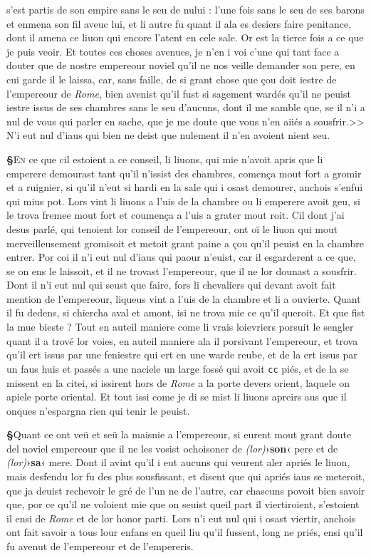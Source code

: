\documentclass[12pt]{article} %
\newcommand{\colmar}[1]{\marginnote{[#1]}}          %
\newcommand{\placeName}[1]{\emph{#1}} %
\newcommand{\num}[1]{\texttt{#1}}    %
\newcommand{\corr}[2]{\emph{(#1)}\textbf{›#2‹}} %
\newcommand{\supplied}[1]{\textlangle#1\textrangle} %
\newcounter{paranum}
\newcommand{\pnum}{\stepcounter{paranum}\textbf{§\arabic{paranum}}\quad}
\begin{document}
s'est partis de son empire sans le seu de nului : l'une fois sans le seu de ses barons et enmena son fil aveuc lui, et li autre fu quant il ala es desiers faire penitance, dont il amena ce liuon qui encore l'atent en cele sale. Or est la tierce fois a ce que je puis veoir. Et toutes ces choses avenues, je n'en i voi c'une qui tant face a douter que de nostre empereour noviel qu'il ne nos veille demander son pere, en cui garde il le laissa, car, sans faille, de si grant chose que çou doit iestre de l'empereour de \placeName{Rome}, bien avenist qu'il fust si sagement wardés qu'il ne peuist iestre issus de ses chambres sans le seu d'aucuns, dont il me samble que, se il n'i a nul de vous qui parler en sache, que je me doute que vous n'en aiiés a sousfrir.>> N'i eut nul d'iaus qui bien ne deist que nulement il n'en avoient nient seu.


\pnum \lettrine[lines=2]{\color{darkblue}E}{n} ce que cil estoient a ce conseil, li liuons, qui mie n'avoit apris que li emperere demourast tant qu'il n'issist des chambres, comença mout fort a gromir et a ruignier, si qu'il n'eut si hardi en la sale qui i osast demourer, anchois s'enfui qui mius pot. Lors vint li liuons a l'uis de la chambre ou li emperere avoit geu, si le trova fremee mout fort et coumença a l'uis a grater mout roit. Cil dont j'ai desus parlé, \supplied{qui} tenoient lor conseil de l'empereour, ont oï le liuon qui mout merveilleusement gromisoit et metoit grant paine a çou qu'il peuist en la chambre entrer. Por coi il n'i eut nul d'iaus qui paour n'euist, car il esgarderent a ce que, se on ens le laissoit, et il ne trovast l'empereour, que il ne lor dounast a sousfrir. Dont il n'i eut nul qui seust que faire, fors li chevaliers qui devant avoit fait mention de l'empereour, liqueus vint a l'uis de la chambre et li a ouvierte. Quant il fu dedens, si chiercha aval et amont, isi ne trova mie ce qu'il queroit. Et que fist la mue bieste ? Tout en auteil maniere come li vrais loievriers porsuit le sengler quant il a trové lor voies, en auteil maniere ala il porsivant l'empereour, et trova qu'il ert issus par une feniestre qui ert en une warde reube, et de la ert issus par un faus huis et passés a une naciele un large fossé qui avoit \num{cc} piés, et de la se missent en la citei, si issirent hors de \placeName{Rome} a la porte devers orient, laquele on apiele porte oriental. Et tout issi come je di se mist li liuons apreirs aus que il onques n'espargna rien qui tenir le peuist.


\pnum Quant ce ont veü et seü la maisnie a l'empereour, si eurent mout grant doute del noviel empereour que il ne les vosist ochoisoner de \corr{lor}{son} pere et de \corr{lor}{sa} mere. Dont il avint qu'il i eut aucuns qui veurent aler apriés le liuon, mais desfendu lor fu des plus sousfissant, et disent que qui apriés iaus se meteroit, que ja deuist \colmar{8vb}\colmar{b} rechevoir le gré de l'un ne de l'autre, car chascuns povoit bien savoir que, por ce qu'il ne voloient mie que on seuist queil part il viertiroient, s'estoie\supplied{n}t il ensi de \placeName{Rome} et de lor honor parti. Lors n'i eut nul qui i osast viertir, anchois ont fait savoir a tous lour enfans en queil liu qu'il fussent, long ne priés, ensi qu'il fu avenut de l'empereour et de l'empereris.
\end{document}

